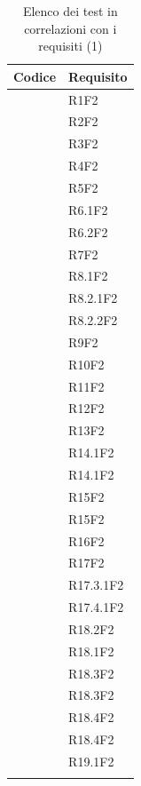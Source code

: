 	\begin{table}[H]
		\centering
		{\def\arraystretch{1.4}
		\begin{tabularx}{\textwidth}{YY}
			\textbf{Codice} & \textbf{Requisito} \\
			\toprule
			\addtots & R1F2 \\
			\addtots & R2F2 \\
			\addtots & R3F2 \\
			\addtots & R4F2 \\
			\addtots & R5F2 \\
			\addtots & R6.1F2 \\
			\addtots & R6.2F2 \\
			\addtots & R7F2 \\
			\addtots & R8.1F2 \\
			\addtots & R8.2.1F2 \\
			\addtots & R8.2.2F2 \\
			\addtots & R9F2 \\
			\addtots & R10F2 \\
			\addtots & R11F2 \\
			\addtots & R12F2 \\
			\addtots & R13F2 \\
			\addtots & R14.1F2 \\			
			\addtots & R14.1F2 \\
			\addtots & R15F2 \\
			\addtots & R15F2 \\
			\addtots & R16F2 \\
			\addtots & R17F2 \\
			\addtots & R17.3.1F2 \\
			\addtots & R17.4.1F2 \\
			\addtots & R18.2F2 \\
			\addtots & R18.1F2 \\
			\addtots & R18.3F2 \\
			\addtots & R18.3F2 \\
			\addtots & R18.4F2 \\
			\addtots & R18.4F2 \\
			\addtots & R19.1F2 \\
            \bottomrule\\
			\end{tabularx}}
		\caption{Elenco dei test in correlazioni con i requisiti (1)}
	\end{table}
    
